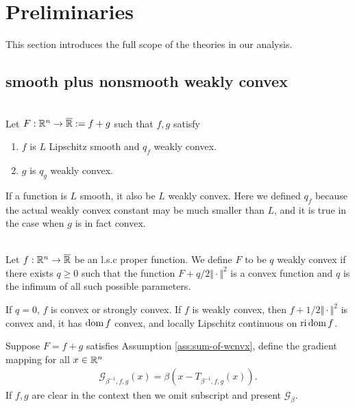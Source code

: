 \documentclass[12pt]{report}
\begin{document}
    \section{Preliminaries}
        This section introduces the full scope of the theories in our analysis. 
        \subsection{smooth plus nonsmooth weakly convex}
            \begin{assumption}\;\label{ass:sum-of-wcnvx}\\
                Let $F: \mathbb R^n \rightarrow \overline{\mathbb R}:= f + g$ such that $f, g$ satisfy 
                \begin{enumerate}
                    \item $f$ is $L$ Lipschitz smooth and $q_f$ weakly convex. 
                    \item $g$ is $q_g$ weakly convex. 
                \end{enumerate}
            \end{assumption}
            \begin{remark}
                If a function is $L$ smooth, it also be $L$ weakly convex. 
                Here we defined $q_f$ because the actual weakly convex constant may be much smaller than $L$, and it is true in the case when $g$ is in fact convex.  
            \end{remark}
            \begin{definition}\;\label{def:wcnvx-fxn}\\
                Let $f: \mathbb R^n \rightarrow\overline {\mathbb R}$ be an l.s.c proper function. 
                We define $F$ to be $q$ weakly convex if there exists $q \ge 0$ such that the function $F + q/2\Vert \cdot\Vert^2$ is a convex function and $q$ is the infimum of all such possible parameters. 
            \end{definition}
            \begin{remark}
                If $q = 0$, $f$ is convex or strongly convex. 
                If $f$ is weakly convex, then $f + 1/2\Vert \cdot\Vert^2$ is convex and, it has $\operatorname{dom} f$ convex, and locally Lipschitz continuous on $\operatorname{ri} \operatorname{dom} f$. 
            \end{remark}
            \begin{definition}
                Suppose $F = f + g$ satisfies Assumption \ref{ass:sum-of-wcnvx}, define the gradient mapping for all $x \in \mathbb R^n$
                \begin{align*}
                    \mathcal G_{\beta^{-1}, f, g}(x) = \beta(x - T_{\beta^{-1}, f, g}(x)). 
                \end{align*}
                If $f, g$ are clear in the context then we omit subscript and present $\mathcal G_\beta$. 
            \end{definition}
\end{document}

